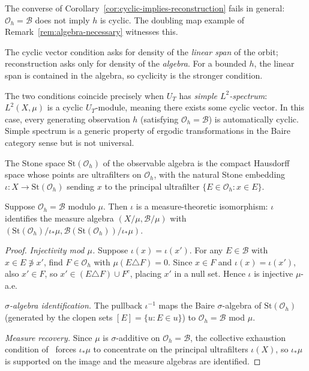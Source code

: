 \begin{remark}
\label{rem:strict}
The converse of Corollary~\ref{cor:cyclic-implies-reconstruction} fails in
general: $\mathcal{O}_h = \mathcal{B}$ does not imply $h$ is cyclic.
The doubling map example of Remark~\ref{rem:algebra-necessary} witnesses this.

The cyclic vector condition asks for density of the \emph{linear span} of the
orbit; reconstruction asks only for density of the \emph{algebra}.  For a bounded
$h$, the linear span is contained in the algebra, so cyclicity is the stronger
condition.

The two conditions coincide precisely when $U_T$ has \emph{simple
$L^2$-spectrum}: $L^2(X,\mu)$ is a cyclic $U_T$-module, meaning there exists
some cyclic vector.  In this case, every generating observation $h$ (satisfying
$\mathcal{O}_h = \mathcal{B}$) is automatically cyclic.  Simple spectrum is
a generic property of ergodic transformations in the Baire category sense
\cite{Halmos1944} but is not universal.
\end{remark}

The Stone space $\mathrm{St}(\mathcal{O}_h)$ of the observable algebra is the
compact Hausdorff space whose points are ultrafilters on $\mathcal{O}_h$, with
the natural Stone embedding $\iota : X \to \mathrm{St}(\mathcal{O}_h)$ sending
$x$ to the principal ultrafilter $\{E \in \mathcal{O}_h : x \in E\}$.

\begin{proposition}
\label{prop:stone-id}
Suppose $\mathcal{O}_h = \mathcal{B}$ modulo $\mu$.  Then $\iota$ is a
measure-theoretic isomorphism: $\iota$ identifies the measure algebra
$(X/\mu, \mathcal{B}/\mu)$ with
$(\mathrm{St}(\mathcal{O}_h)/\iota_*\mu,
\mathcal{B}(\mathrm{St}(\mathcal{O}_h))/\iota_*\mu)$.
\end{proposition}

\begin{proof}
\emph{Injectivity mod $\mu$.}  Suppose $\iota(x) = \iota(x')$.  For any
$E \in \mathcal{B}$ with $x \in E \not\ni x'$, find $F \in \mathcal{O}_h$
with $\mu(E \triangle F) = 0$.  Since $x \in F$ and $\iota(x) = \iota(x')$,
also $x' \in F$, so $x' \in (E \triangle F) \cup F^c$, placing $x'$ in a
null set.  Hence $\iota$ is injective $\mu$-a.e.

\emph{$\sigma$-algebra identification.}  The pullback $\iota^{-1}$ maps the
Baire $\sigma$-algebra of $\mathrm{St}(\mathcal{O}_h)$ (generated by the
clopen sets $[E] = \{u : E \in u\}$) to $\mathcal{O}_h = \mathcal{B}$ mod
$\mu$.

\emph{Measure recovery.}  Since $\mu$ is $\sigma$-additive on
$\mathcal{O}_h = \mathcal{B}$, the collective exhaustion condition
of~\cite{mahon_paper1} forces $\iota_*\mu$ to concentrate on the principal
ultrafilters $\iota(X)$, so $\iota_*\mu$ is supported on the image and the
measure algebras are identified.
\end{proof}

